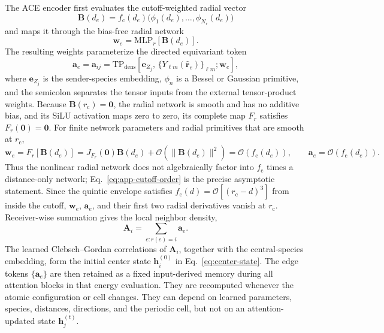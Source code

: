 \documentclass[aps,prx,preprint,notitlepage,superscriptaddress,nofootinbib,floatfix]{revtex4-2}
\newcommand{\vect}[1]{\bm{#1}}
\newif\ifshowrevisions
\newenvironment{draftthirtyoneblock}
  {\ifshowrevisions\color{draftthirtyonecolor}\fi}
  {}
\newenvironment{draftthirtytwoblock}
  {\ifshowrevisions\color{draftthirtytwocolor}\fi}
  {}
\begin{document}
\begin{draftthirtyoneblock}
The ACE encoder first evaluates the cutoff-weighted radial vector
\begin{equation}
 \vect B(d_e)=f_{\mathrm c}(d_e)
 \bigl(\phi_1(d_e),\ldots,\phi_{N_r}(d_e)\bigr)
 \label{eq:app-radial-vector}
\end{equation}
and maps it through the bias-free radial network
\begin{equation}
 \vect w_e=\mathrm{MLP}_{r}\!\left[\vect B(d_e)\right].
 \label{eq:app-radial-weights}
\end{equation}
The resulting weights parameterize the directed equivariant token
\begin{equation}
 \vect a_e=\vect a_{ij}
 =\mathrm{TP}_{\mathrm{dens}}\!\left[
 \vect e_{Z_j},\,
 \{Y_{\ell m}(\widehat{\vect r}_e)\}_{\ell m};
 \vect w_e
 \right],
 \label{eq:app-edge-token}
\end{equation}
where \(\vect e_{Z_j}\) is the sender-species embedding,
\(\phi_n\) is a Bessel or Gaussian primitive, and the semicolon separates the
tensor inputs from the external tensor-product weights.
\begin{draftthirtytwoblock}
Because \(\vect B(r_{\mathrm c})=\vect 0\), the radial network is smooth and
has no additive bias, and its SiLU activation maps zero to zero, its complete
map \(F_r\) satisfies \(F_r(\vect 0)=\vect 0\). For finite network parameters
and radial primitives that are smooth at \(r_{\mathrm c}\),
\begin{equation}
 \vect w_e=F_r[\vect B(d_e)]
 =J_{F_r}(\vect 0)\vect B(d_e)
 +\mathcal O(\lVert\vect B(d_e)\rVert^2)
 =\mathcal O(f_{\mathrm c}(d_e)),
 \qquad
 \vect a_e=\mathcal O(f_{\mathrm c}(d_e)).
 \label{eq:app-cutoff-order}
\end{equation}
Thus the nonlinear radial network does not algebraically factor into
\(f_{\mathrm c}\) times a distance-only network; Eq.~\eqref{eq:app-cutoff-order}
is the precise asymptotic statement. Since the quintic envelope satisfies
\(f_{\mathrm c}(d)=\mathcal O[(r_{\mathrm c}-d)^3]\) from inside the cutoff,
\(\vect w_e\), \(\vect a_e\), and their first two radial derivatives vanish at
\(r_{\mathrm c}\).
\end{draftthirtytwoblock}
Receiver-wise summation gives the local neighbor density,
\begin{equation}
 \vect A_i=\sum_{e:r(e)=i}\vect a_e .
 \label{eq:app-density}
\end{equation}
The learned Clebsch--Gordan correlations of \(\vect A_i\), together with the
central-species embedding, form the initial center state
\(\vect h_i^{(0)}\) in Eq.~\eqref{eq:center-state}. The edge tokens
\(\{\vect a_e\}\) are then retained as a fixed input-derived memory during all
attention blocks in that energy evaluation. They are recomputed whenever the
atomic configuration or cell changes. They can depend on learned parameters,
species, distances, directions, and the periodic cell, but not on an
attention-updated state \(\vect h_j^{(t)}\).


\end{draftthirtyoneblock}
\end{document}

